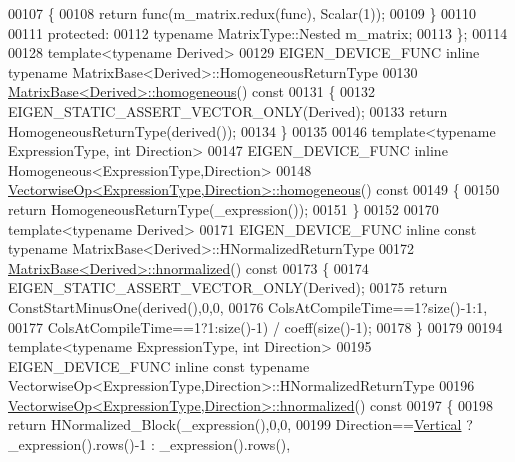 \begin{DoxyCode}
00107 \textcolor{keyword}{    }\{
00108       \textcolor{keywordflow}{return} func(m\_matrix.redux(func), Scalar(1));
00109     \}
00110 
00111   \textcolor{keyword}{protected}:
00112     \textcolor{keyword}{typename} MatrixType::Nested m\_matrix;
00113 \};
00114 
00128 \textcolor{keyword}{template}<\textcolor{keyword}{typename} Derived>
00129 EIGEN\_DEVICE\_FUNC \textcolor{keyword}{inline} \textcolor{keyword}{typename} MatrixBase<Derived>::HomogeneousReturnType
00130 \hyperlink{group___geometry___module_ga8cd24704519bf35e1724e1915d477a35}{MatrixBase<Derived>::homogeneous}()\textcolor{keyword}{ const}
00131 \textcolor{keyword}{}\{
00132   EIGEN\_STATIC\_ASSERT\_VECTOR\_ONLY(Derived);
00133   \textcolor{keywordflow}{return} HomogeneousReturnType(derived());
00134 \}
00135 
00146 \textcolor{keyword}{template}<\textcolor{keyword}{typename} ExpressionType, \textcolor{keywordtype}{int} Direction>
00147 EIGEN\_DEVICE\_FUNC \textcolor{keyword}{inline} Homogeneous<ExpressionType,Direction>
00148 \hyperlink{group___geometry___module_ga7ae337c185a1de2343f12be4577c75fc}{VectorwiseOp<ExpressionType,Direction>::homogeneous}()\textcolor{keyword}{
       const}
00149 \textcolor{keyword}{}\{
00150   \textcolor{keywordflow}{return} HomogeneousReturnType(\_expression());
00151 \}
00152 
00170 \textcolor{keyword}{template}<\textcolor{keyword}{typename} Derived>
00171 EIGEN\_DEVICE\_FUNC \textcolor{keyword}{inline} \textcolor{keyword}{const} \textcolor{keyword}{typename} MatrixBase<Derived>::HNormalizedReturnType
00172 \hyperlink{group___geometry___module_gad7e913733107a9a1b61bff95ec9c03dd}{MatrixBase<Derived>::hnormalized}()\textcolor{keyword}{ const}
00173 \textcolor{keyword}{}\{
00174   EIGEN\_STATIC\_ASSERT\_VECTOR\_ONLY(Derived);
00175   \textcolor{keywordflow}{return} ConstStartMinusOne(derived(),0,0,
00176     ColsAtCompileTime==1?size()-1:1,
00177     ColsAtCompileTime==1?1:size()-1) / coeff(size()-1);
00178 \}
00179 
00194 \textcolor{keyword}{template}<\textcolor{keyword}{typename} ExpressionType, \textcolor{keywordtype}{int} Direction>
00195 EIGEN\_DEVICE\_FUNC \textcolor{keyword}{inline} \textcolor{keyword}{const} \textcolor{keyword}{typename} VectorwiseOp<ExpressionType,Direction>::HNormalizedReturnType
00196 \hyperlink{group___geometry___module_ga8d3b6f7178b905b0e4418fd4900c4463}{VectorwiseOp<ExpressionType,Direction>::hnormalized}()\textcolor{keyword}{
       const}
00197 \textcolor{keyword}{}\{
00198   \textcolor{keywordflow}{return} HNormalized\_Block(\_expression(),0,0,
00199       Direction==\hyperlink{group__enums_ggad49a7b3738e273eb00932271b36127f7addca718e0564723df21d61b94b1198be}{Vertical}   ? \_expression().rows()-1 : \_expression().rows(),

\end{DoxyCode}
